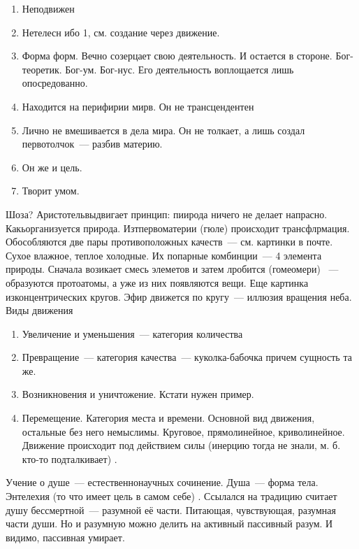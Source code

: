 \begin{enumerate}
	\item Неподвижен
	\item Нетелесн ибо 1, см. создание через движение. 
	\item Форма форм. Вечно созерцает свою деятельность. И остается в стороне. Бог-теоретик. Бог-ум. Бог-нус. Его деятельность воплощается лишь опосредованно. 
	\item Находится на перифирии мирв. Он не трансцендентен
	\item Лично не вмешивается в дела мира. Он не толкает, а лишь создал первотолчок~--- разбив материю. 
	\item Он же и цель. 
	\item Творит умом. 
\end{enumerate}

Шоза?
Аристотельвыдвигает принцип: пиирода ничего не делает напрасно. Какьорганизуется природа. Изтпервоматерии (гюле) происходит трансфлрмация. Обособляются две пары противоположных качеств~--- см. картинки в почте. Сухое влажное, теплое холодные. Их попарные комбинции~--- 4 элемента природы. Сначала возикает смесь элеметов и затем лробится (гомеомери) ~--- образуются протоатомы, а уже из них появляются вещи. 
Еще картинка изконцентрических кругов. Эфир движется по кругу~--- иллюзия вращения неба. 
Виды движения

\begin{enumerate}
	\item Увеличение и уменьшения~--- категория количества
	\item Превращение~--- категория качества~--- куколка-бабочка причем сущность та же. 
	\item Возникновения и уничтожение. Кстати нужен пример. 
	\item Перемещение. Категория места и времени. Основной вид движения, остальные без него немыслимы. Круговое, прямолинейное, криволинейное. Движение происходит под действием силы (инерцию тогда не знали, м. б. кто-то подталкивает) . 
\end{enumerate}

Учение о душе~--- естественнонаучных сочинение. Душа~--- форма тела. Энтелехия (то что имеет цель в самом себе) . Ссылался на традицию считает душу бессмертной~--- разумной её части. Питающая, чувствующая, разумная части души. Но и разумную можно делить на активный пассивный разум. И видимо, пассивная умирает. 
 